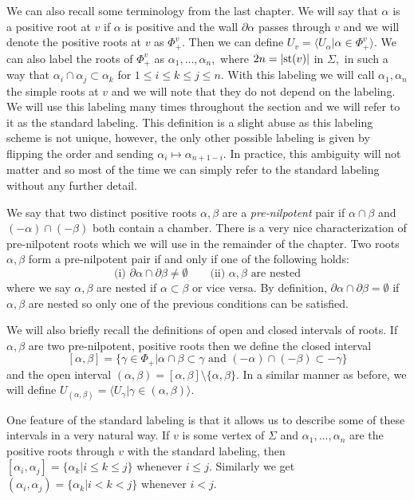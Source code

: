 \documentclass[class=book, crop=false,12 pt]{standalone}
\begin{document}
We can also recall some terminology from the last chapter. We will say that $\alpha$ is a positive root at $v$ if $\alpha$ is positive and the wall $\partial\alpha$ passes through $v$ and we will denote the positive roots at $v$ as $\Phi^v_+.$ Then we can define $U_v=\langle U_\alpha|\alpha\in \Phi^v_+\rangle.$ We can also label the roots of $\Phi^v_+$ as $\alpha_1,\dots,\alpha_n,$ where $2n=|\mathrm{st}(v)|$ in $\Sigma,$ in such a way that $\alpha_i\cap \alpha_j\subset \alpha_k$ for $1\le i\le k\le j\le n.$ With this labeling we will call $\alpha_1,\alpha_n$ the simple roots at $v$ and we will note that they do not depend on the labeling. We will use this labeling many times throughout the section and we will refer to it as the standard labeling. This definition is a slight abuse as this labeling scheme is not unique, however, the only other possible labeling is given by flipping the order and sending $\alpha_i\mapsto \alpha_{n+1-i}.$ In practice, this ambiguity will not matter and so most of the time we can simply refer to the standard labeling without any further detail.

We say that two distinct positive roots $\alpha,\beta$ are  a \emph{pre-nilpotent} pair if $\alpha\cap \beta$ and $(-\alpha)\cap (-\beta)$ both contain a chamber. There is a very nice characterization of pre-nilpotent roots which we will use in the remainder of the chapter. Two roots $\alpha,\beta$ form a pre-nilpotent pair if and only if one of the following holds:
\[
	\text{(i) }\partial \alpha \cap \partial \beta \neq \emptyset\qquad \text{(ii) } \alpha,\beta \text{ are nested}
\]
where we say $\alpha,\beta$ are nested if $\alpha \subset \beta$ or vice versa. By definition, $\partial \alpha \cap \partial \beta=\emptyset$ if $\alpha,\beta$ are nested so only one of the previous conditions can be satisfied.

We will also briefly recall the definitions of open and closed intervals of roots. If $\alpha,\beta$ are two pre-nilpotent, positive roots then we define the closed interval
\[
	[\alpha,\beta]=\{\gamma\in \Phi_+|\alpha\cap\beta\subset \gamma\text{ and }(-\alpha)\cap (-\beta)\subset -\gamma\}
\]
and the open interval $(\alpha,\beta)=[\alpha,\beta]\setminus\{\alpha,\beta\}.$ In a similar manner as before, we will define $U_{(\alpha,\beta)}=\langle U_\gamma|\gamma\in (\alpha,\beta)\rangle.$

One feature of the standard labeling is that it allows us to describe some of these intervals in a very natural way. If $v$ is some vertex of $\Sigma$ and $\alpha_1,\dots,\alpha_n$ are the positive roots through $v$ with the standard labeling, then $[\alpha_i,\alpha_j]=\{\alpha_k|i\le k \le j\}$ whenever $i\le j.$ Similarly we get $(\alpha_i,\alpha_j)=\{\alpha_k|i<k<j\}$ whenever $i<j.$
\end{document}
